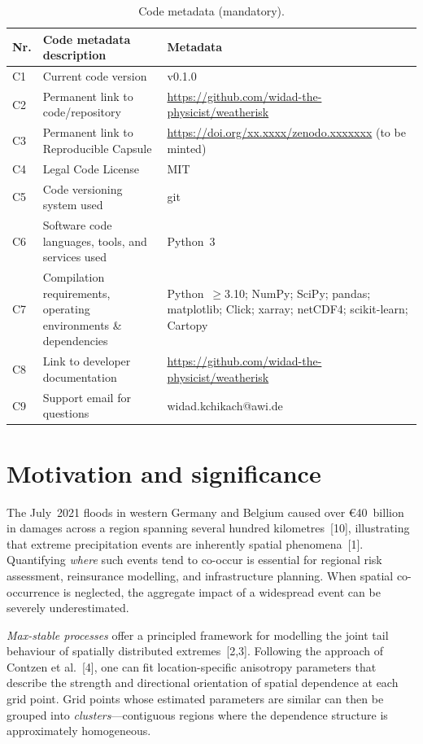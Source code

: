 \documentclass[preprint,12pt,a4paper]{elsarticle}
\begin{document}
\begin{table}[!h]
\begin{tabular}{|l|p{6.5cm}|p{6.5cm}|}
\hline
\textbf{Nr.} & \textbf{Code metadata description} & \textbf{Metadata} \\
\hline
C1 & Current code version & v0.1.0 \\
\hline
C2 & Permanent link to code/repository &
  \url{https://github.com/widad-the-physicist/weatherisk} \\
\hline
C3 & Permanent link to Reproducible Capsule &
  \url{https://doi.org/xx.xxxx/zenodo.xxxxxxx} (to be minted) \\
\hline
C4 & Legal Code License & MIT \\
\hline
C5 & Code versioning system used & git \\
\hline
C6 & Software code languages, tools, and services used & Python~3 \\
\hline
C7 & Compilation requirements, operating environments
  \& dependencies &
  Python~$\geq$3.10; NumPy; SciPy; pandas; matplotlib;
  Click; xarray; netCDF4; scikit-learn; Cartopy \\
\hline
C8 & Link to developer documentation &
  \url{https://github.com/widad-the-physicist/weatherisk} \\
\hline
C9 & Support email for questions & widad.kchikach@awi.de \\
\hline
\end{tabular}
\caption{Code metadata (mandatory).}
\label{tab:metadata}
\end{table}


\section{Motivation and significance}
\label{sec:motivation}

The July~2021 floods in western Germany and Belgium caused over
\euro{}40~billion in damages across a region spanning several hundred
kilometres~[10], illustrating that extreme precipitation events are
inherently spatial phenomena~[1].  Quantifying \emph{where} such
events tend to co-occur is essential for regional risk assessment,
reinsurance modelling, and infrastructure planning.  When spatial
co-occurrence is neglected, the aggregate impact of a widespread
event can be severely underestimated.

\emph{Max-stable processes} offer a principled framework for
modelling the joint tail behaviour of spatially distributed
extremes~[2,3].  Following the approach of Contzen et al.~[4],
one can fit location-specific anisotropy parameters that describe
the strength and directional orientation of spatial dependence at
each grid point.  Grid points whose estimated parameters are
similar can then be grouped into \emph{clusters}---contiguous
regions where the dependence structure is approximately
homogeneous.
\end{document}
